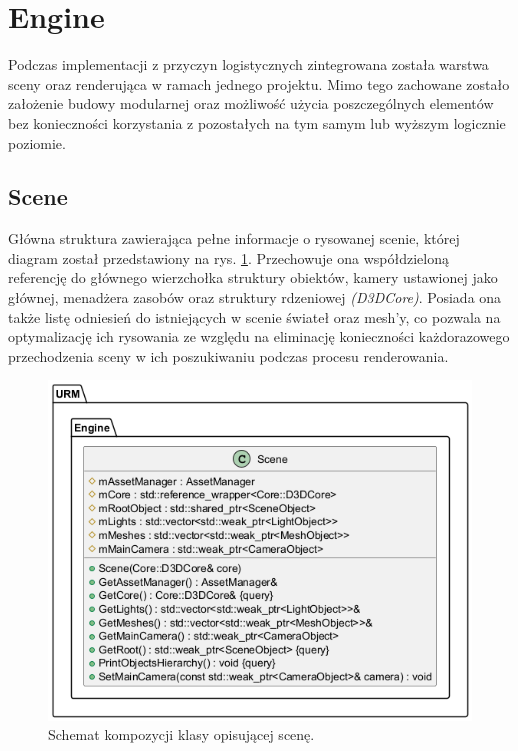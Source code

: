 	\vfill
	\clearpage
	
\section{Engine}
	Podczas implementacji z przyczyn logistycznych zintegrowana została warstwa sceny oraz renderująca w ramach jednego projektu. Mimo tego zachowane zostało założenie budowy modularnej oraz możliwość użycia poszczególnych elementów bez konieczności korzystania z pozostałych na tym samym lub wyższym logicznie poziomie.
	
\subsection{Scene}
	Główna struktura zawierająca pełne informacje o rysowanej scenie, której diagram został przedstawiony na rys. \ref{UML_Scene}. Przechowuje ona współdzieloną referencję do głównego wierzchołka struktury obiektów, kamery ustawionej jako głównej, menadżera zasobów oraz struktury rdzeniowej \textit{(D3DCore)}. Posiada ona także listę odniesień do istniejących w scenie świateł oraz mesh'y, co pozwala na optymalizację ich rysowania ze względu na eliminację konieczności każdorazowego przechodzenia sceny w ich poszukiwaniu podczas procesu renderowania.
	
	\begin{figure}[h!]
		\centering
		\includegraphics[width=\textwidth]{images/UML/scene.png}
		\caption{Schemat kompozycji klasy opisującej scenę.}
		\label{UML_Scene}
	\end{figure}
	
